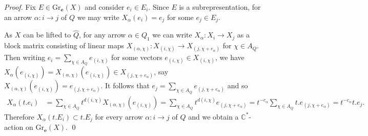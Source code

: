 \documentclass[smallextended,envcountsect,envcountsame]{svjour3}
\numberwithin{equation}{section}
\newcommand{\CC}{\mathbb{C}}
\newcommand{\bfe}{\mathbf{e}}
\newcommand{\Gr}{\mathrm{Gr}}
\begin{document}
\begin{proof} 
  Fix $E\in\Gr_\bfe(X)$ and consider $e_i\in E_i$.
  Since $E$ is a subrepresentation, for an arrow $\alpha:i\to j$ of $Q$ we may write $X_\alpha(e_i)=e_j$ for some $e_j\in E_j$.

  As $X$ can be lifted to $\hat Q$, for any arrow $\alpha\in Q_1$ we can write $X_\alpha:X_i\to X_j$ as a block matrix consisting of linear maps $X_{(\alpha,\chi)}:X_{(i,\chi)}\to X_{(j,\chi+e_\alpha)}$ for $\chi\in A_Q$.
  Then writing $e_i=\sum_{\chi\in A_Q} e_{(i,\chi)}$ for some vectors $e_{(i,\chi)}\in X_{(i,\chi)}$, we have $X_\alpha(e_{(i,\chi)})=X_{(\alpha,\chi)}(e_{(i,\chi)})\in X_{(j,\chi+e_\alpha)}$, say $X_{(\alpha,\chi)}(e_{(i,\chi)})=e_{(j,\chi+e_\alpha)}$.
  It follows that $e_j=\sum_{\chi\in A_Q} e_{(j,\chi+e_\alpha)}$ and so
  \begin{align*}
    X_\alpha(t.e_i)
    &=\sum\limits_{\chi\in A_Q} t^{d(i,\chi)}X_{(\alpha,\chi)}(e_{(i,\chi)})=\sum\limits_{\chi\in A_Q} t^{d(i,\chi)}e_{(j,\chi+e_\alpha)}=t^{-c_\alpha}\sum\limits_{\chi\in A_Q} t.e_{(j,\chi+e_\alpha)}=t^{-c_\alpha} t.e_j.
  \end{align*}
  Therefore $X_\alpha(t.E_i)\subset t.E_j$ for every arrow $\alpha:i\to j$ of $Q$ and we obtain a $\CC^*$-action on $\Gr_\bfe(X)$.
\qed\end{proof}
\end{document}

